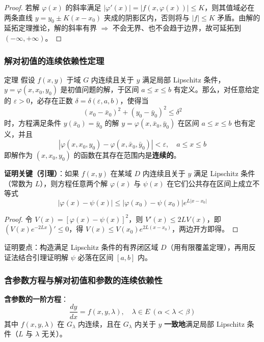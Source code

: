 \begin{proof}
若解 $\varphi(x)$ 的斜率满足 $|\varphi'(x)| = |f(x, \varphi(x))| \le K$，则其值域必在两条直线 $y = y_0 \pm K(x - x_0)$ 夹成的阴影区内，否则将与 $|f| \le K$ 矛盾。由解的延拓定理推论，解的斜率有界 $\Rightarrow$ 不会无界、也不会趋于边界，故可延拓到 $(-\infty, +\infty)$。
\end{proof}

\subsubsection{解对初值的连续依赖性定理}

\begin{myTheorem}{定理}
假设 $f(x,y)$ 于域 $G$ 内连续且关于 $y$ 满足局部 Lipschitz 条件，$y = \varphi(x, x_0, y_0)$ 是初值问题的解，于区间 $a \le x \le b$ 有定义。那么，对任意给定的 $\varepsilon > 0$，必存在正数 $\delta = \delta(\varepsilon, a, b)$，使得当
$$(x_0 - \bar{x}_0)^2 + (y_0 - \bar{y}_0)^2 \le \delta^2$$
时，方程满足条件 $y(\bar{x}_0) = \bar{y}_0$ 的解 $y = \varphi(x, \bar{x}_0, \bar{y}_0)$ 在区间 $a \le x \le b$ 也有定义，并且
$$|\varphi(x, x_0, y_0) - \varphi(x, \bar{x}_0, \bar{y}_0)| < \varepsilon, \quad a \le x \le b$$
即解作为 $(x, x_0, y_0)$ 的函数在其存在范围内是\textbf{连续的}。
\end{myTheorem}

\textbf{证明关键（引理）}：如果 $f(x,y)$ 在某域 $D$ 内连续且关于 $y$ 满足 Lipschitz 条件（常数为 $L$），则方程任意两个解 $\varphi(x)$ 与 $\psi(x)$ 在它们公共存在区间上成立不等式
$$|\varphi(x) - \psi(x)| \le |\varphi(x_0) - \psi(x_0)|e^{L|x - x_0|}$$

\begin{proof}
令 $V(x) = [\varphi(x) - \psi(x)]^2$，则 $V'(x) \le 2LV(x)$，即 $(V(x)e^{-2Lx})' \le 0$，得 $V(x) \le V(x_0)e^{2L(x-x_0)}$，两边开方即得。
\end{proof}

证明要点：构造满足 Lipschitz 条件的有界闭区域 $D$（用有限覆盖定理），再用反证法结合引理证明解 $\psi$ 必落在区间 $[a,b]$ 内。

\subsubsection{含参数方程与解对初值和参数的连续依赖性}

\textbf{含参数的一阶方程}：
$$\frac{dy}{dx} = f(x, y, \lambda), \quad \lambda \in E \ (\alpha < \lambda < \beta)$$
其中 $f(x, y, \lambda)$ 在 $G_\lambda$ 内连续，且在 $G_\lambda$ 内关于 $y$ \textbf{一致地}满足局部 Lipschitz 条件（$L$ 与 $\lambda$ 无关）。

